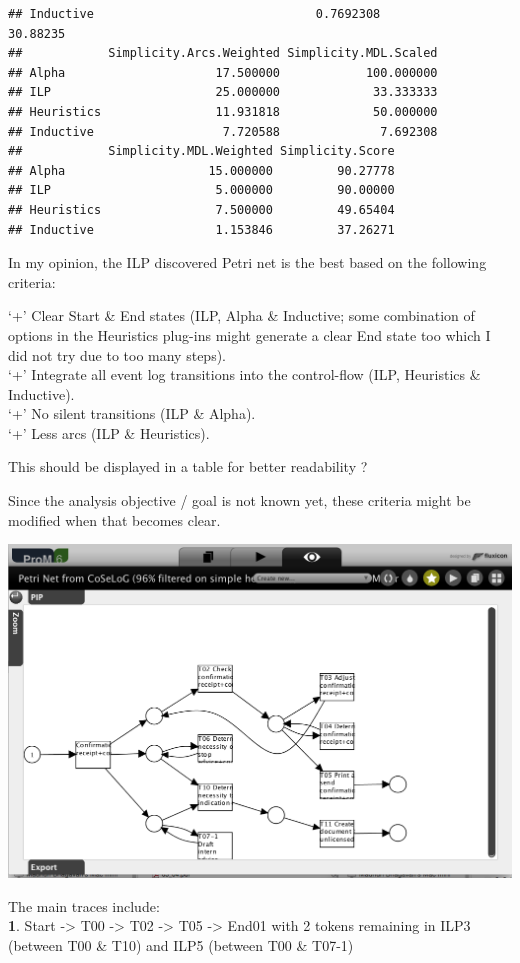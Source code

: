 \documentclass[]{article}
\begin{document}
\begin{verbatim}
## Inductive                               0.7692308               30.88235
##            Simplicity.Arcs.Weighted Simplicity.MDL.Scaled
## Alpha                     17.500000            100.000000
## ILP                       25.000000             33.333333
## Heuristics                11.931818             50.000000
## Inductive                  7.720588              7.692308
##            Simplicity.MDL.Weighted Simplicity.Score
## Alpha                    15.000000         90.27778
## ILP                       5.000000         90.00000
## Heuristics                7.500000         49.65404
## Inductive                 1.153846         37.26271
\end{verbatim}

In my opinion, the ILP discovered Petri net is the best based on the
following criteria:

`+' Clear Start \& End states (ILP, Alpha \& Inductive; some combination
of options in the Heuristics plug-ins might generate a clear End state
too which I did not try due to too many steps).\\`+' Integrate all event
log transitions into the control-flow (ILP, Heuristics \&
Inductive).\\`+' No silent transitions (ILP \& Alpha).\\`+' Less arcs
(ILP \& Heuristics).

This should be displayed in a table for better readability ?

Since the analysis objective / goal is not known yet, these criteria
might be modified when that becomes clear.

\includegraphics{CoSeLoG_Step_05_Filter96_PetriNet_ILP.png}

The main traces include:\\\textbf{1}. Start -\textgreater{} T00
-\textgreater{} T02 -\textgreater{} T05 -\textgreater{} End01 with 2
tokens remaining in ILP3 (between T00 \& T10) and ILP5 (between T00 \&
T07-1)
\end{document}
